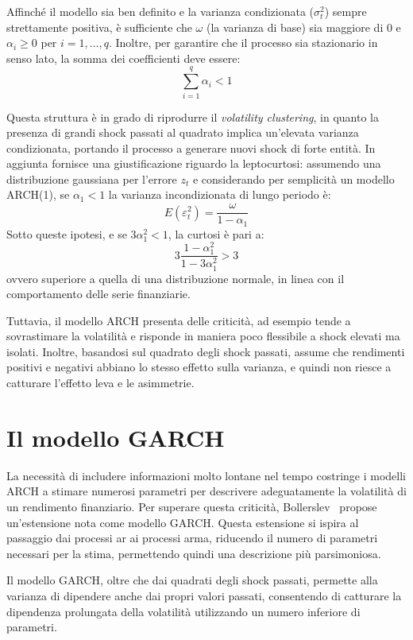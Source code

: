 Affinché il modello sia ben definito e la varianza condizionata ($\sigma_t^2$) sempre strettamente positiva, è sufficiente che $\omega$ (la varianza di base) sia maggiore di $0$ e $\alpha_i \geq 0$ per $i=1,\dots,q$. Inoltre, per garantire che il processo sia stazionario in senso lato, la somma dei coefficienti deve essere:
\[
    \sum_{i=1}^q \alpha_i < 1
\]

Questa struttura è in grado di riprodurre il \emph{volatility clustering}, in quanto la presenza di grandi shock passati al quadrato implica un'elevata varianza condizionata, portando il processo a generare nuovi shock di forte entità. 
In aggiunta fornisce una giustificazione riguardo la leptocurtosi: assumendo una distribuzione gaussiana per l'errore $z_t$ e considerando per semplicità un modello ARCH(1), se $\alpha_1 < 1$ la varianza incondizionata di lungo periodo è:
\[
    E(\varepsilon_t^2) = \frac{\omega}{1-\alpha_1}
\]
Sotto queste ipotesi, e se $3\alpha_1^2 < 1$, la curtosi è pari a:
\[
    3 \frac{1-\alpha_1^2}{1-3\alpha_1^2} > 3
\]
ovvero superiore a quella di una distribuzione normale, in linea con il comportamento delle serie finanziarie.

Tuttavia, il modello ARCH presenta delle criticità, ad esempio tende a sovrastimare la volatilità e risponde in maniera poco flessibile a shock elevati ma isolati. Inoltre, basandosi sul quadrato degli shock passati, assume che rendimenti positivi e negativi abbiano lo stesso effetto sulla varianza, e quindi non riesce a catturare l'effetto leva e le asimmetrie.



\section{Il modello GARCH}
\label{sec:modello-garch}
La necessità di includere informazioni molto lontane nel tempo costringe i modelli ARCH a stimare numerosi parametri per descrivere adeguatamente la volatilità di un rendimento finanziario. 
Per superare questa criticità, Bollerslev~\cite{bollerslev:garch} propose un'estensione nota come modello GARCH. 
Questa estensione si ispira al passaggio dai processi \gls{ar} ai processi \gls{arma}, riducendo il numero di parametri necessari per la stima, permettendo quindi una descrizione più parsimoniosa.

Il modello GARCH, oltre che dai quadrati degli shock passati, permette alla varianza di dipendere anche dai propri valori passati, consentendo di catturare la dipendenza prolungata della volatilità utilizzando un numero inferiore di parametri.

